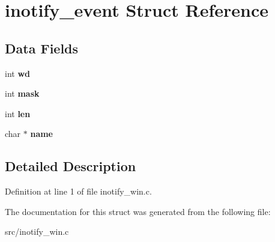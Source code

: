 \hypertarget{structinotify__event}{\section{inotify\-\_\-event \-Struct \-Reference}
\label{structinotify__event}
}
\subsection*{\-Data \-Fields}
\begin{DoxyCompactItemize}
\item 
\hypertarget{structinotify__event_a65f7a3509bf7d880d7edcf4dca5997c8}{int {\bfseries wd}}\label{structinotify__event_a65f7a3509bf7d880d7edcf4dca5997c8}

\item 
\hypertarget{structinotify__event_a9f46a4a643372ee8ac4d2f85871fa91c}{int {\bfseries mask}}\label{structinotify__event_a9f46a4a643372ee8ac4d2f85871fa91c}

\item 
\hypertarget{structinotify__event_aebd8767d689dbe6c04a489fd84e38860}{int {\bfseries len}}\label{structinotify__event_aebd8767d689dbe6c04a489fd84e38860}

\item 
\hypertarget{structinotify__event_a856d3c3713003f54ea447e138352a07e}{char $\ast$ {\bfseries name}}\label{structinotify__event_a856d3c3713003f54ea447e138352a07e}

\end{DoxyCompactItemize}


\subsection{\-Detailed \-Description}


\-Definition at line 1 of file inotify\-\_\-win.\-c.



\-The documentation for this struct was generated from the following file\-:\begin{DoxyCompactItemize}
\item 
src/inotify\-\_\-win.\-c\end{DoxyCompactItemize}
